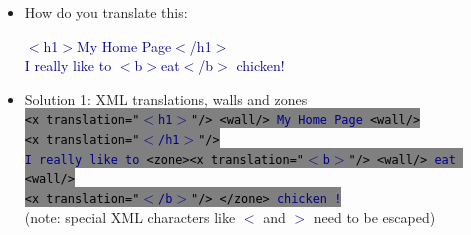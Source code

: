 \documentclass[landscape]{uedslides2C}
\newcommand{\example}[1]{\textcolor{darkblue}{\rm #1}}
\newcommand{\littlecode}[1]{\colorbox{gray}{\textcolor{black}{\small \tt #1}}}
\begin{document}
\begin{itemize}
\item How do you translate this:
\begin{center}
\example{$<$h1$>$My Home Page$<$/h1$>$\\
I really like to $<$b$>$eat$<$/b$>$ chicken!}
\end{center}
\item Solution 1: XML translations, walls and zones\\[5mm]
\littlecode{<x translation="\example{$<$h1$>$}"/> <wall/> \example{My Home Page} <wall/>}\\[-2mm]
\littlecode{<x translation="\example{$<$/h1$>$}"/>}\\[2mm]
\littlecode{\example{I really like to} <zone><x translation="\example{$<$b$>$}"/> <wall/> \example{eat} <wall/>}\\[-2mm]
\littlecode{<x translation="\example{$<$/b$>$}"/> </zone> \example{chicken !}}\\[5mm]
(note: special XML characters like \example{$<$} and \example{$>$} need to be escaped)
\end{itemize}

\end{document}
